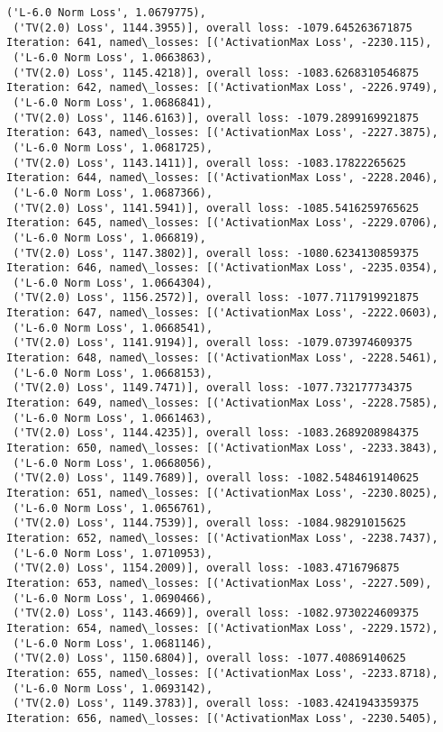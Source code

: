\documentclass[10pt]{article}
\begin{document}
\begin{Verbatim}[commandchars=\\\{\}]
 ('L-6.0 Norm Loss', 1.0679775),
 ('TV(2.0) Loss', 1144.3955)], overall loss: -1079.645263671875
Iteration: 641, named\_losses: [('ActivationMax Loss', -2230.115),
 ('L-6.0 Norm Loss', 1.0663863),
 ('TV(2.0) Loss', 1145.4218)], overall loss: -1083.6268310546875
Iteration: 642, named\_losses: [('ActivationMax Loss', -2226.9749),
 ('L-6.0 Norm Loss', 1.0686841),
 ('TV(2.0) Loss', 1146.6163)], overall loss: -1079.2899169921875
Iteration: 643, named\_losses: [('ActivationMax Loss', -2227.3875),
 ('L-6.0 Norm Loss', 1.0681725),
 ('TV(2.0) Loss', 1143.1411)], overall loss: -1083.17822265625
Iteration: 644, named\_losses: [('ActivationMax Loss', -2228.2046),
 ('L-6.0 Norm Loss', 1.0687366),
 ('TV(2.0) Loss', 1141.5941)], overall loss: -1085.5416259765625
Iteration: 645, named\_losses: [('ActivationMax Loss', -2229.0706),
 ('L-6.0 Norm Loss', 1.066819),
 ('TV(2.0) Loss', 1147.3802)], overall loss: -1080.6234130859375
Iteration: 646, named\_losses: [('ActivationMax Loss', -2235.0354),
 ('L-6.0 Norm Loss', 1.0664304),
 ('TV(2.0) Loss', 1156.2572)], overall loss: -1077.7117919921875
Iteration: 647, named\_losses: [('ActivationMax Loss', -2222.0603),
 ('L-6.0 Norm Loss', 1.0668541),
 ('TV(2.0) Loss', 1141.9194)], overall loss: -1079.073974609375
Iteration: 648, named\_losses: [('ActivationMax Loss', -2228.5461),
 ('L-6.0 Norm Loss', 1.0668153),
 ('TV(2.0) Loss', 1149.7471)], overall loss: -1077.732177734375
Iteration: 649, named\_losses: [('ActivationMax Loss', -2228.7585),
 ('L-6.0 Norm Loss', 1.0661463),
 ('TV(2.0) Loss', 1144.4235)], overall loss: -1083.2689208984375
Iteration: 650, named\_losses: [('ActivationMax Loss', -2233.3843),
 ('L-6.0 Norm Loss', 1.0668056),
 ('TV(2.0) Loss', 1149.7689)], overall loss: -1082.5484619140625
Iteration: 651, named\_losses: [('ActivationMax Loss', -2230.8025),
 ('L-6.0 Norm Loss', 1.0656761),
 ('TV(2.0) Loss', 1144.7539)], overall loss: -1084.98291015625
Iteration: 652, named\_losses: [('ActivationMax Loss', -2238.7437),
 ('L-6.0 Norm Loss', 1.0710953),
 ('TV(2.0) Loss', 1154.2009)], overall loss: -1083.4716796875
Iteration: 653, named\_losses: [('ActivationMax Loss', -2227.509),
 ('L-6.0 Norm Loss', 1.0690466),
 ('TV(2.0) Loss', 1143.4669)], overall loss: -1082.9730224609375
Iteration: 654, named\_losses: [('ActivationMax Loss', -2229.1572),
 ('L-6.0 Norm Loss', 1.0681146),
 ('TV(2.0) Loss', 1150.6804)], overall loss: -1077.40869140625
Iteration: 655, named\_losses: [('ActivationMax Loss', -2233.8718),
 ('L-6.0 Norm Loss', 1.0693142),
 ('TV(2.0) Loss', 1149.3783)], overall loss: -1083.4241943359375
Iteration: 656, named\_losses: [('ActivationMax Loss', -2230.5405),

\end{Verbatim}
\end{document}
